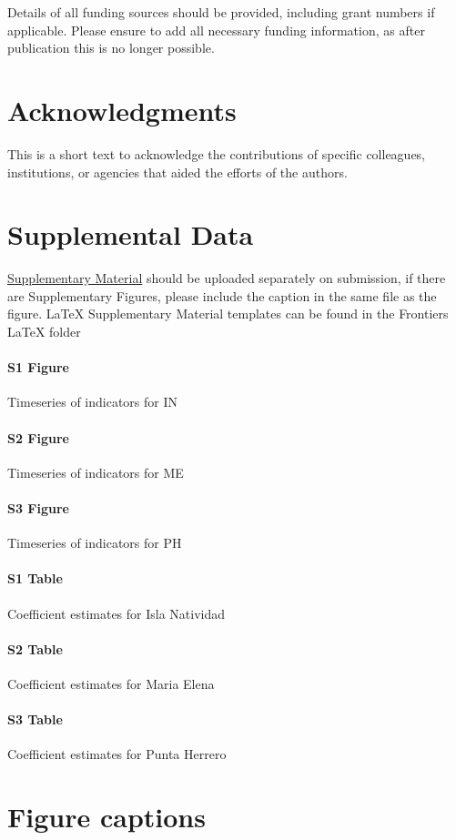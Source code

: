 \documentclass{frontiersSCNS}
\theoremstyle{definition}
\theoremstyle{definition}
\theoremstyle{definition}
\theoremstyle{remark}
\begin{document}
Details of all funding sources should be provided, including grant
numbers if applicable. Please ensure to add all necessary funding
information, as after publication this is no longer possible.

\section*{Acknowledgments}

This is a short text to acknowledge the contributions of specific
colleagues, institutions, or agencies that aided the efforts of the
authors.

\section*{Supplemental Data}

\href{http://home.frontiersin.org/about/author-guidelines#SupplementaryMaterial}{Supplementary Material}
should be uploaded separately on submission, if there are Supplementary
Figures, please include the caption in the same file as the figure.
LaTeX Supplementary Material templates can be found in the Frontiers
LaTeX folder

\paragraph*{S1 Figure}
\label{S1_Figure}

Timeseries of indicators for IN

\paragraph*{S2 Figure}
\label{S2_Figure}

Timeseries of indicators for ME

\paragraph*{S3 Figure}
\label{S3_Figure}

Timeseries of indicators for PH

\paragraph*{S1 Table}
\label{S1_Table}

Coefficient estimates for Isla Natividad

\paragraph*{S2 Table}
\label{S2_Table}

Coefficient estimates for Maria Elena

\paragraph*{S3 Table}
\label{S3_Table}

Coefficient estimates for Punta Herrero



\section*{Figure captions}
\end{document}
